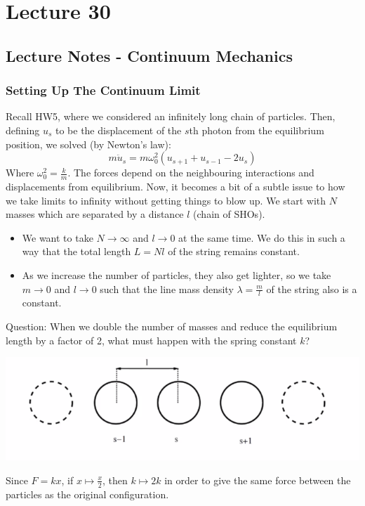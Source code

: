 \documentclass[../PHYS306Notes.tex]{subfiles}
\begin{document}
\section{Lecture 30}
\subsection{Lecture Notes - Continuum Mechanics}
\subsubsection{Setting Up The Continuum Limit}
Recall HW5, where we considered an infinitely long chain of particles. Then, defining $u_s$ to be the displacement of the $s$th photon from the equilibrium position, we solved (by Newton's law):
\[m\ddot{u}_s = m\omega_0^2(u_{s+1} + u_{s-1} - 2u_s)\]
Where $\omega_0^2 = \frac{k}{m}$. The forces depend on the neighbouring interactions and displacements from equilibrium. Now, it becomes a bit of a subtle issue to how we take limits to infinity without getting things to blow up.
\newline We start with $N$ masses which are separated by a distance $l$ (chain of SHOs).
\begin{itemize}
    \item  We want to take $N \rightarrow \infty$ and $l \rightarrow 0$ at the same time. We do this in such a way that the total length $L = Nl$ of the string remains constant.
    \item  As we increase the number of particles, they also get lighter, so we take $m \rightarrow 0$ and $l \rightarrow 0$ such that the line mass density $\lambda = \frac{m}{l}$ of the string also is a constant.
\end{itemize}
Question: When we double the number of masses and reduce the equilibrium length by a factor of 2, what must happen with the spring constant $k$?
\begin{center}
    \includegraphics[scale=1]{Lecture-30/l30-img1.png}
\end{center}
\begin{s}
Since $F = kx$, if $x \mapsto \frac{x}{2}$, then $k \mapsto 2k$ in order to give the same force between the particles as the original configuration. 
\end{s}
\end{document}
